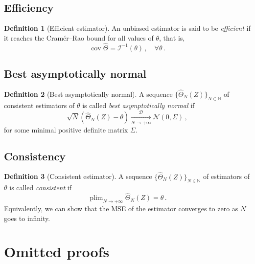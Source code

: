 \documentclass[final]{aomart}
\newtheorem[{}\it]{thm}{Theorem}[section]
\theoremstyle{definition}
\newtheorem{defn}{Definition}[section]
\newtheorem*[{}\it]{notation}{Notation}
\numberwithin{equation}{section}
\newcommand{\wh}{\widehat}
\newcommand{\hTheta}{\wh{\Theta}} %
\newcommand{\fisher}{\mathcal{I}} %
\DeclareMathOperator{\cov}{cov}
\DeclareMathOperator*{\plim}{plim}
\begin{document}
\subsection{Efficiency}
\begin{defn}[Efficient estimator]
	An unbiased estimator is said to be \emph{efficient} if it reaches the Cramér--Rao bound for all values of \(\theta\), that is,
	\begin{equation}
	\cov \hTheta = \fisher^{-1}(\theta)\,, \quad \forall \theta\,.
	\end{equation}
\end{defn}
\label{def_eff}
\subsection{Best asymptotically normal}
\begin{defn}[Best asymptotically normal]
	A sequence \(\{\hTheta_N(Z)\}_{N \in \mathbb{N}}\) of consistent estimators of \(\theta\) is called \emph{best asymptotically normal} if
	\begin{equation}
	\sqrt{N} \left(\hTheta_N(Z) - \theta\right) \xrightarrow[N \to +\infty]{\mathcal{D}} \mathcal{N}(0, \Sigma)\,,
	\end{equation}
	for some minimal positive definite matrix \(\Sigma\).
\end{defn}
\label{def_normal}
\subsection{Consistency}
\begin{defn}[Consistent estimator]
	A sequence \(\{\hTheta_N(Z)\}_{N \in \mathbb{N}}\) of estimators of \(\theta\) is called \emph{consistent} if
	\begin{equation}
	\plim_{N \to +\infty} \hTheta_N(Z) = \theta\,.
	\end{equation}
	Equivalently, we can show that the MSE of the estimator converges to zero as \(N\) goes to infinity.
\end{defn}
\label{def_consis}

\section{Omitted proofs}
\end{document}
